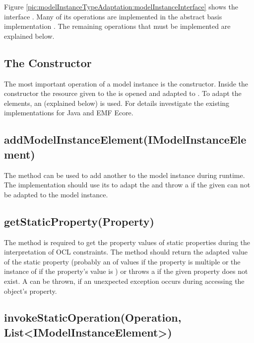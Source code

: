Figure \ref{pic:modelInstanceTypeAdaptation:modelInstanceInterface} shows the interface . Many of its operations are implemented in the abstract basis implementation . The remaining operations that must be implemented are explained below.


\subsection{The Constructor}

The most important operation of a model instance is the constructor. Inside the constructor the resource given to the  is opened and adapted to . To adapt the elements, an  (explained below) is used. For details investigate the existing  implementations for Java and \acs{EMF} Ecore.


\subsection{addModelInstanceElement(IModelInstanceElement)}

The method  can be used to add another  to the model instance during runtime. The implementation should use its  to adapt the  and throw a  if the given  can not be adapted to the model instance.


\subsection{getStaticProperty(Property)}

The method  is required to get the property values of static properties during the interpretation of \acs{OCL} constraints. The method should return the adapted value of the static property (probably an  of values if the property is multiple or the instance of  if the property's value is ) or throws a  if the given property does not exist. A  can be thrown, if an unexpected exception occurs during accessing the object's property.


\subsection{invokeStaticOperation(Operation, List<IModelInstanceElement>)}
			
